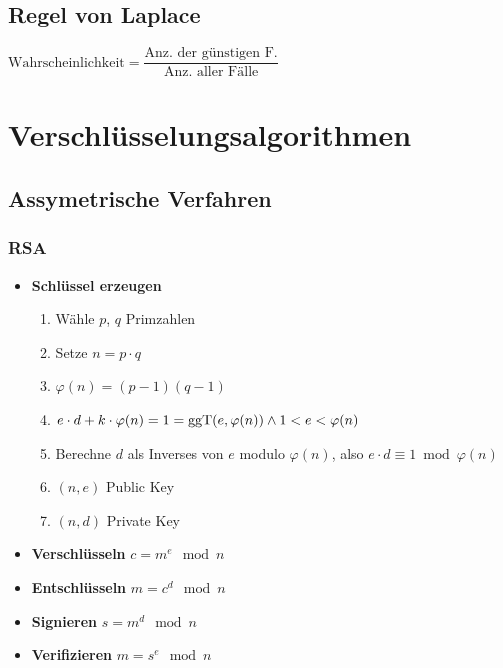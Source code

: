 \documentclass[8pt,a4paper,landscape]{article}
\begin{document}
\begin{multicols}{4}
\subsection{Regel von Laplace}
$\textrm{Wahrscheinlichkeit} = \dfrac{\textrm{Anz. der günstigen F.}}{\textrm{Anz. aller Fälle}}$

\section{Verschlüsselungsalgorithmen}
\subsection{Assymetrische Verfahren}
\subsubsection{RSA}

\begin{itemize}[itemsep=2pt, leftmargin=0pt] 
\item[] \textbf{Schlüssel erzeugen} \begin{enumerate}[itemsep=1pt] 
    \item Wähle $p$, $q$ Primzahlen
    \item Setze $n = p \cdot q$
    \item $\varphi(n) = (p-1)(q-1)$
    \item $e \cdot d + k \cdot \varphi(n) = 1 = \operatorname {ggT}(e, \varphi(n)) \land \\ 1<e<\varphi(n)$
    \item Berechne $d$ als Inverses von $e$ modulo $\varphi(n)$, also 
          $e \cdot d \equiv 1 \bmod \varphi(n)$
    \item $(n,e)$ Public Key
    \item $(n,d)$ Private Key
\end{enumerate}
\item[] \textbf{Verschlüsseln} $c = m^{e} \mod n$ 
\item[] \textbf{Entschlüsseln} $m = c^{d} \mod n$
\item[] \textbf{Signieren} $s = m^d \mod n$
\item[] \textbf{Verifizieren} $m = s^e \mod n$
\end{itemize}


\end{multicols}
\end{document}
